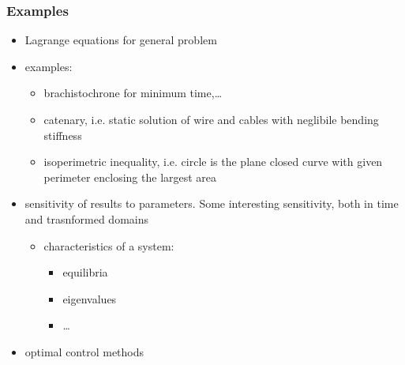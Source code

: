 \documentclass[letterpaper,10pt,english]{jupyterBook}
\begin{document}
\subsubsection*{Examples}
\begin{itemize}
\item {} 
\sphinxAtStartPar
Lagrange equations for general problem

\item {} 
\sphinxAtStartPar
examples:
\begin{itemize}
\item {} 
\sphinxAtStartPar
brachistochrone for minimum time,…

\item {} 
\sphinxAtStartPar
catenary, i.e. static solution of wire and cables with neglibile bending stiffness

\item {} 
\sphinxAtStartPar
isoperimetric inequality, i.e. circle is the plane closed curve with given perimeter enclosing the largest area

\end{itemize}

\item {} 
\sphinxAtStartPar
sensitivity of results to parameters. Some interesting sensitivity, both in time and trasnformed domains
\begin{itemize}
\item {} 
\sphinxAtStartPar
characteristics of a system:
\begin{itemize}
\item {} 
\sphinxAtStartPar
equilibria

\item {} 
\sphinxAtStartPar
eigenvalues

\item {} 
\sphinxAtStartPar
…

\end{itemize}

\end{itemize}

\item {} 
\sphinxAtStartPar
optimal control methods

\end{itemize}
\end{document}
